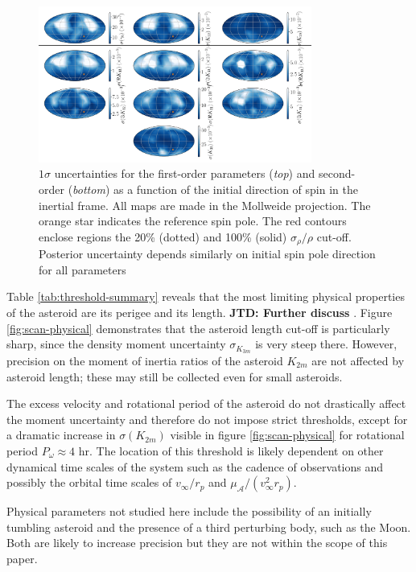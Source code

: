 \documentclass[fleqn,usenatbib]{mnras}
\newcommand{\jtd}[1]{ {\bf{\color{red} JTD: #1}} }
\begin{document}
\begin{figure}
  \centering
  \includegraphics[width=0.8\textwidth]{figs/spin-pole.png}
  \caption{$1\sigma$ uncertainties for the first-order parameters (\textit{top}) and second-order (\textit{bottom}) as a function of the initial direction of spin in the inertial frame. All maps are made in the Mollweide projection. The orange star indicates the reference spin pole. The red contours enclose regions the 20\% (dotted) and 100\% (solid) $\sigma_\rho / \rho$ cut-off. Posterior uncertainty depends similarly on initial spin pole direction for all parameters}
  \label{fig:scan-spin}
\end{figure}


Table \ref{tab:threshold-summary} reveals that the most limiting physical properties of the asteroid are its perigee and its length. \jtd{Further discuss}. Figure \ref{fig:scan-physical} demonstrates that the asteroid length cut-off is particularly sharp, since the density moment uncertainty $\sigma_{K_{3m}}$ is very steep there. However, precision on the moment of inertia ratios of the asteroid $K_{2m}$ are not affected by asteroid length; these may still be collected even for small asteroids.

The excess velocity and rotational period of the asteroid do not drastically affect the moment uncertainty and therefore do not impose strict thresholds, except for a dramatic increase in $\sigma(K_{2m})$ visible in figure \ref{fig:scan-physical} for rotational period $P_\omega \approx 4$ hr. The location of this threshold is likely dependent on other dynamical time scales of the system such as the cadence of observations and possibly the orbital time scales of $v_\infty / r_p$ and $\mu_\mathcal{A} / (v_\infty^2 r_p)$.

Physical parameters not studied here include the possibility of an initially tumbling asteroid and the presence of a third perturbing body, such as the Moon. Both are likely to increase precision but they are not within the scope of this paper.
\end{document}
